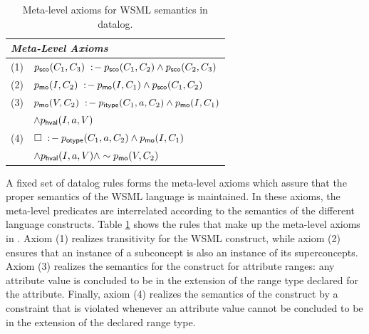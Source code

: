 \begin{table}[tb]\label{tab:meta-level}\centering
\begin{small}
\begin{tabular}{|ll|}
  \hline
  \multicolumn{2}{|l|}{\rule{0cm}{3.2mm}{\normalsize \emph{Meta-Level Axioms}}} \\
  \hline
  (1) & $p_{\mathrm{\sf sco}}(C_1,C_3) \;:\!-\: p_{\mathrm{\sf sco}}(C_1,C_2) \wedge p_{\mathrm{\sf sco}}(C_2,C_3)$ \\
  (2) & $p_{\mathrm{\sf mo}}(I,C_2) \;:\!-\: p_{\mathrm{\sf mo}}(I,C_1) \wedge p_{\mathrm{\sf sco}}(C_1,C_2)$ \\
  (3) & $p_{\mathrm{\sf mo}}(V,C_2) \;:\!-\: p_{\mathrm{\sf itype}}(C_1,a,C_2) \wedge p_{\mathrm{\sf mo}}(I,C_1)$ \\
  & \phantom{$\pmo(V,C_2) \dlogrule$} $\wedge p_{\mathrm{\sf hval}}(I,a,V)$ \\
  (4) & $\square\;:\!-\: p_{\mathrm{\sf otype}}(C_1,a,C_2) \wedge p_{\mathrm{\sf mo}}(I,C_1)$ \\
  & \phantom{$\dlogcstr$} $\wedge p_{\mathrm{\sf hval}}(I,a,V) \wedge \sim p_{\mathrm{\sf mo}}(V,C_2)$ \\
 \hline
\end{tabular}
\end{small} \caption{Meta-level axioms for WSML semantics in
datalog.}
\end{table}

A fixed set \mlaxioms of datalog rules forms the meta-level axioms
which assure that the proper semantics of the WSML language is
maintained. In these axioms, the meta-level predicates are
interrelated according to the semantics of the different language
constructs. Table \ref{tab:meta-level} shows the rules that make
up the meta-level axioms in \mlaxioms. Axiom (1) realizes
transitivity for the WSML  construct, while
axiom (2) ensures that an instance of a subconcept is also an
instance of its superconcepts. Axiom (3) realizes the semantics
for the  construct for attribute ranges: any
attribute value is concluded to be in the extension of the range
type declared for the attribute. Finally, axiom (4) realizes the
semantics of the  construct by a constraint that is
violated whenever an attribute value cannot be concluded to be in
the extension of the declared range type.
